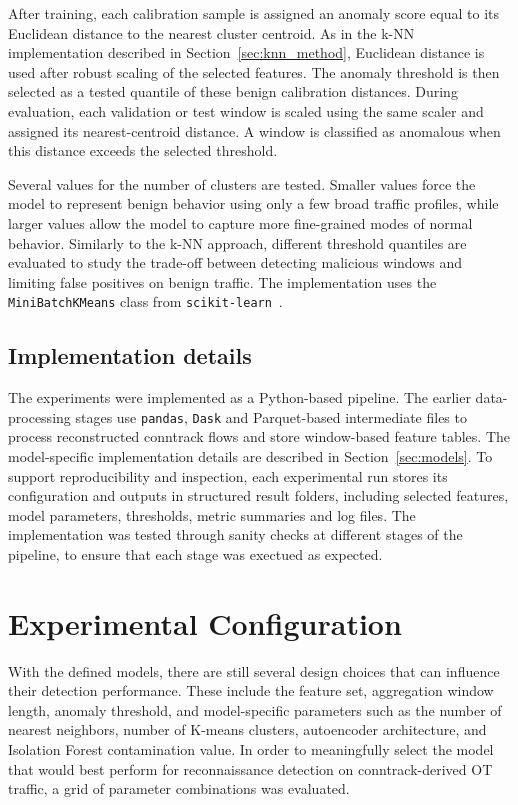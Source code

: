 After training, each calibration sample is assigned an anomaly score equal to its Euclidean distance to the nearest cluster centroid. As in the k-NN implementation described in Section~\ref{sec:knn_method}, Euclidean distance is used after robust scaling of the selected features.  The anomaly threshold is then selected as a tested quantile of these benign calibration distances. During evaluation, each validation or test window is scaled using the same scaler and assigned its nearest-centroid distance. A window is classified as anomalous when this distance exceeds the selected threshold.

Several values for the number of clusters are tested. Smaller values force the model to represent benign behavior using only a few broad traffic profiles, while larger values allow the model to capture more fine-grained modes of normal behavior. Similarly to the k-NN approach, different threshold quantiles are evaluated to study the trade-off between detecting malicious windows and limiting false positives on benign traffic.  The implementation uses the \texttt{MiniBatchKMeans} class from \texttt{scikit-learn}~\cite{pedregosa_scikit-learn_nodate}.

\subsection{Implementation details}

The experiments were implemented as a Python-based pipeline. The earlier data-processing stages use \texttt{pandas}, \texttt{Dask} and Parquet-based intermediate files to process reconstructed conntrack flows and store window-based feature tables. The model-specific implementation details are described in Section~\ref{sec:models}. To support reproducibility and inspection, each experimental run stores its configuration and outputs in structured result folders, including selected features, model parameters, thresholds, metric summaries and log files. The implementation was tested through sanity checks at different stages of the pipeline, to ensure that each stage was exectued as expected.








\section{Experimental Configuration}
\label{sec:experimental_configuration}   
With the defined models, there are still several design choices that can influence their detection performance. These include the feature set, aggregation window length, anomaly threshold, and model-specific parameters such as the number of nearest neighbors, number of K-means clusters, autoencoder architecture, and Isolation Forest contamination value. In order to meaningfully select the model that would best perform for reconnaissance detection on conntrack-derived OT traffic, a grid of parameter combinations was evaluated.


